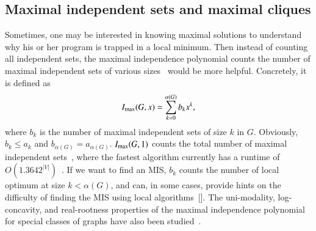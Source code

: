 \documentclass[onefignum, onetabnum]{siamart190516}
\newcommand{\<}{\langle}
\renewcommand{\>}{\rangle}
\newcommand{\red}[1]{[{\bf  \color{red}{ST: #1}}]}
\begin{document}
\subsection{Maximal independent sets and maximal cliques}\label{sec:maximal}
Sometimes, one may be interested in knowing maximal solutions to understand why his or her program is trapped in a local minimum.
Then instead of counting all independent sets, the maximal independence polynomial counts the number of maximal independent sets of various sizes~\cite{Hu2017} would be more helpful.
 Concretely, it is defined as
\begin{equation}
I_{\rm max}(G, x) = \sum_{k=0}^{\alpha(G)} b_k x^k,
\end{equation}
where $b_k$ is the number of maximal independent sets of size $k$ in $G$.
Obviously, $b_{k} \leq a_{k}$ and $b_{\alpha(G)} = a_{\alpha(G)}$. $I_{\rm max}(G, 1)$ counts the total number of maximal independent sets~\cite{Gaspers2012, Manne2013}, where the fastest algorithm currently has a runtime of $O(1.3642^{|V|})$~\cite{Gaspers2012}.
If we want to find an MIS, $b_{k}$ counts the number of local optimum at size $k < \alpha(G)$, and can, in some cases, provide hints on the difficulty of finding the MIS using local algorithms~\red{cite experiment}.
The uni-modality, log-concavity, and real-rootness properties of the maximal independence polynomial for special classes of graphs have also been studied~\cite{Hu2017}. 
\end{document}
